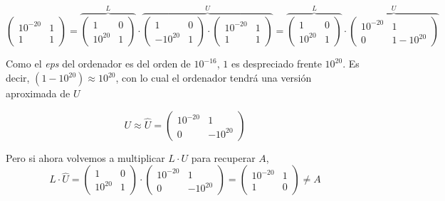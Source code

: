 \begin{equation*}
\begin{pmatrix}
10^{-20}& 1\\
1& 1 
\end{pmatrix}=\overbrace{\begin{pmatrix}
1& 0\\
10^{20}& 1 
\end{pmatrix}}^{L}\cdot \overbrace{\begin{pmatrix}
1& 0\\
-10^{20}& 1
\end{pmatrix}\cdot \begin{pmatrix}
10^{-20}& 1\\
1& 1
\end{pmatrix}}^{U}= \overbrace{\begin{pmatrix}
1& 0\\
10^{20}& 1 
\end{pmatrix}}^{L} \cdot \overbrace{\begin{pmatrix}
10^{-20}& 1\\
0& 1 -10^{20} 
\end{pmatrix}}^{U} 
\end{equation*} 

Como el \emph{eps} del ordenador es del orden de $10^{-16}$, $1$ es despreciado frente $10^{20}$. Es decir, $(1-10^{20})\approx 10^{20}$, con lo cual el ordenador tendrá una versión aproximada de $U$

\begin{equation*}
U \approx \hat{U}= \begin{pmatrix}
10^{-20}& 1\\
0& -10^{20} 
\end{pmatrix} 
\end{equation*}

Pero si ahora volvemos a multiplicar $L\cdot U$  para recuperar $A$,
\begin{equation*}
L \cdot \hat{U}=  \begin{pmatrix}
1& 0\\
10^{20}& 1 
\end{pmatrix} \cdot \begin{pmatrix}
10^{-20}& 1\\
0& -10^{20} 
\end{pmatrix}= \begin{pmatrix}
10^{-20}& 1\\
1& 0
\end{pmatrix} \neq A
\end{equation*}


